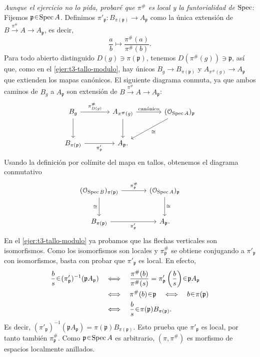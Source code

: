 \begin{sol}
\medskip
\noindent\emph{Aunque el ejercicio no lo pida, probaré que $\pi^\#$ es local y la funtorialidad de $\operatorname{Spec}$}:\\
Fijemos $\mathfrak p\en\Spec A$. Definimos $\pi'_{\mathfrak p}\colon B_{\pi(\mathfrak p)}\to A_{\mathfrak p}$ como la única extensión de $B\xrightarrow{\pi^\#}A\to A_{\mathfrak p}$, es decir,
\[
\frac{a}{b}\longmapsto\frac{\pi^\#(a)}{\pi^\#(b)}.
\]
Para todo abierto distinguido $D(g)\ni\pi(\mathfrak p)$, tenemos $D(\pi^\#(g))\ni\mathfrak p$, así que, como en el \cref{ejer:t3-tallo-modulo}, hay únicos $B_g\to B_{\pi(\mathfrak p)}$ y $A_{\pi^\#(g)}\to A_{\mathfrak p}$ que extienden los mapas canónicos. El siguiente diagrama conmuta, ya que ambos caminos de $B_g$ a $A_{\mathfrak p}$ son extensión de $B\xrightarrow{\pi^\#}A\to A_{\mathfrak p}$:
\[
\begin{tikzcd}[column sep=large,row sep=large]
B_g\arrow[r,"\pi^\#_{D(g)}"]\arrow[d]
&A_{\pi^\#(g)}\arrow[d]\arrow[r,"\text{canónico}"]
&(\mathcal O_{\Spec A})_{\mathfrak p}\arrow[dl,"\cong"]\\
B_{\pi(\mathfrak p)}\arrow[r,"\pi'_{\mathfrak p}"']&A_{\mathfrak p}.
\end{tikzcd}
\]
Usando la definición por colímite del mapa en tallos, obtenemos el diagrama conmutativo
\[
\begin{tikzcd}[column sep=large,row sep=large]
(\mathcal O_{\Spec B})_{\pi(\mathfrak p)}\arrow[r,"\pi^\#_{\mathfrak p}"]\arrow[d,"\cong"']
&(\mathcal O_{\Spec A})_{\mathfrak p}\arrow[d,"\cong"]\\
B_{\pi(\mathfrak p)}\arrow[r,"\pi'_{\mathfrak p}"']&A_{\mathfrak p}.
\end{tikzcd}
\]
En el \cref{ejer:t3-tallo-modulo} ya probamos que las flechas verticales son isomorfismos. Como los isomorfismos son locales y $\pi^\#_{\mathfrak p}$ se obtiene conjugando a $\pi'_{\mathfrak p}$ con isomorfismos, basta con probar que $\pi'_{\mathfrak p}$ es local. En efecto,
\[
\begin{aligned}
\frac{b}{s}\en(\pi'_{\mathfrak p})^{-1}(\mathfrak p A_{\mathfrak p})
&\quad\Longleftrightarrow\quad
\frac{\pi^\#(b)}{\pi^\#(s)}=\pi'_{\mathfrak p}\left(\frac{b}{s}\right)\en\mathfrak p A_{\mathfrak p}\\
&\quad\Longleftrightarrow\quad\pi^\#(b)\en\mathfrak p
\quad\Longleftrightarrow\quad b\en\pi(\mathfrak p)\\
&\quad\Longleftrightarrow\quad\frac{b}{s}\en\pi(\mathfrak p)B_{\pi(\mathfrak p)}.
\end{aligned}
\]
Es decir, $(\pi'_{\mathfrak p})^{-1}(\mathfrak p A_{\mathfrak p})=\pi(\mathfrak p)B_{\pi(\mathfrak p)}$. Esto prueba que $\pi'_{\mathfrak p}$ es local, por tanto también $\pi^\#_{\mathfrak p}$. Como $\mathfrak p\en\Spec A$ es arbitrario, $(\pi,\pi^\#)$ es morfismo de espacios localmente anillados.


\end{sol}
